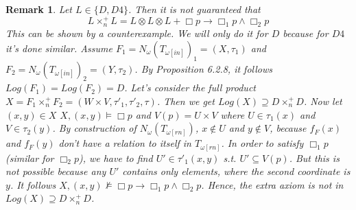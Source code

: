 \documentclass[12pt, a4paper]{scrartcl}
\newtheorem{remark}[definition]{Remark}
\begin{document}
    \begin{remark}
        Let $L \in \{D, D4\}$. Then it is not guaranteed that $$L \times^+_n L = L \otimes L \otimes L + \Box p \rightarrow \Box_1 p \land \Box_2 p$$
        This can be shown by a counterexample. We will only do it for $D$ because for $D4$ it's done similar. Assume $F_1 = N_\omega(T_{\omega[in]})_1 = (X, \tau_1)$ and $F_2 = N_\omega(T_{\omega[in]})_2 = (Y, \tau_2)$.
        By Proposition 6.2.8, it follows $Log(F_1) = Log(F_2) = D$. Let's consider the full product $X = F_1 \times^+_n F_2 = (W \times V, \tau'_1, \tau'_2, \tau)$. Then we get $Log(X) \supseteq D \times^+_n D$. Now let $(x,y) \in X$
        $X,(x,y) \vDash \Box p$ and $V(p) = U \times V$ where $U \in \tau_1(x)$ and $V \in \tau_2(y)$. By construction of $N_\omega(T_{\omega[rn]})$, $x \notin U$ and $ y \notin V$, because $f_F(x)$ and $f_F(y)$ don't have a relation to itself in $T_{\omega[rn]}$.
        In order to satisfy $\Box_1 p$ (similar for $\Box_2 p$), we have to find $U' \in \tau'_1(x,y)$ s.t. $U' \subseteq V(p)$. But this is not possible because any $U'$ contains only elements, where the second coordinate is $y$. It follows $X, (x,y) \nvDash \Box p \rightarrow \Box_1 p \land \Box_ 2 p$.
        Hence, the extra axiom is not in $Log(X) \supseteq D \times^+_n D$. 

    \end{remark}
\end{document}
